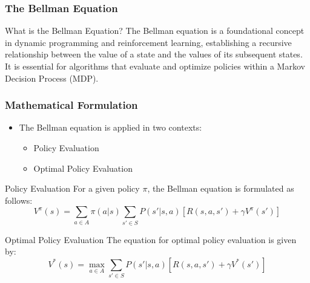 \documentclass{beamer}
\begin{document}
\begin{frame}[fragile]
    \frametitle{The Bellman Equation}
    \begin{block}{What is the Bellman Equation?}
        The Bellman equation is a foundational concept in dynamic programming and reinforcement learning, establishing a recursive relationship between the value of a state and the values of its subsequent states. 
        It is essential for algorithms that evaluate and optimize policies within a Markov Decision Process (MDP).
    \end{block}
\end{frame}

\begin{frame}[fragile]
    \frametitle{Mathematical Formulation}
    \begin{itemize}
        \item The Bellman equation is applied in two contexts: 
        \begin{itemize}
            \item Policy Evaluation
            \item Optimal Policy Evaluation
        \end{itemize}
    \end{itemize}
    
    \begin{block}{Policy Evaluation}
        For a given policy \( \pi \), the Bellman equation is formulated as follows:
        \begin{equation}
            V^{\pi}(s) = \sum_{a \in A} \pi(a|s) \sum_{s' \in S} P(s'|s, a) [R(s, a, s') + \gamma V^{\pi}(s')]
        \end{equation}
    \end{block}

    \begin{block}{Optimal Policy Evaluation}
        The equation for optimal policy evaluation is given by:
        \begin{equation}
            V^*(s) = \max_{a \in A} \sum_{s' \in S} P(s'|s, a) [R(s, a, s') + \gamma V^*(s')]
        \end{equation}
    \end{block}
\end{frame}
\end{document}
